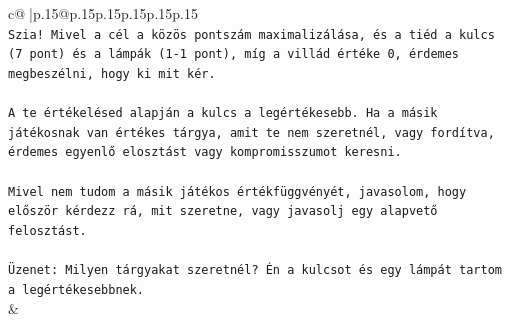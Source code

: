 \documentclass{article}
\begin{document}
{\begin{supertabular}{c@{$\;$}|p{.15\linewidth}@{}p{.15\linewidth}p{.15\linewidth}p{.15\linewidth}p{.15\linewidth}p{.15\linewidth}}
{{{\\ 
\texttt{Szia! Mivel a cél a közös pontszám maximalizálása, és a tiéd a kulcs (7 pont) és a lámpák (1{-}1 pont), míg a villád értéke 0, érdemes megbeszélni, hogy ki mit kér.} \\
\\ 
\texttt{A te értékelésed alapján a kulcs a legértékesebb. Ha a másik játékosnak van értékes tárgya, amit te nem szeretnél, vagy fordítva, érdemes egyenlő elosztást vagy kompromisszumot keresni.} \\
\\ 
\texttt{Mivel nem tudom a másik játékos értékfüggvényét, javasolom, hogy először kérdezz rá, mit szeretne, vagy javasolj egy alapvető felosztást.} \\
\\ 
\texttt{Üzenet: Milyen tárgyakat szeretnél? Én a kulcsot és egy lámpát tartom a legértékesebbnek.} \\
            }
        }
    }
    & \\ \\


\end{supertabular}}
\end{document}
